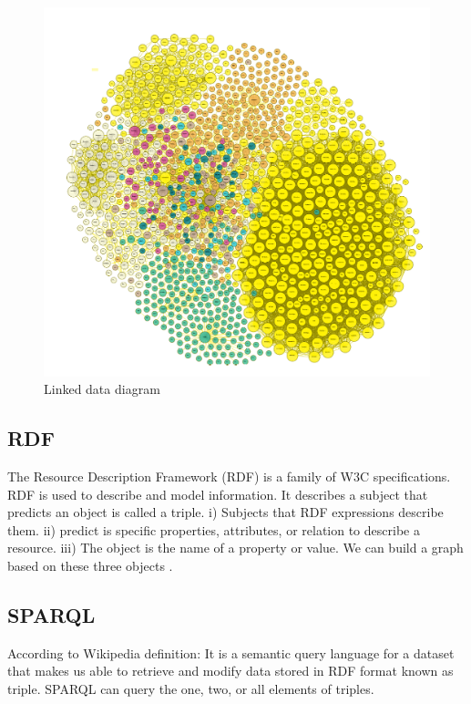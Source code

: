 \begin{center}
	\begin{figure}[htb!]
		
		\begin{minipage}{0.55\linewidth}
			\centering
			\includegraphics[width=1.55\textwidth]{images/chap02_LinkData.png}
		\end{minipage}
		\caption[Linked data diagram]{Linked data diagram \cite{Hector}}
		
		
	\end{figure}
	
\end{center}
\subsection{RDF}
The Resource Description Framework (RDF) is a family of W3C specifications. RDF is used to describe and model information. It describes a subject that predicts an object is called a triple.
i) Subjects that RDF expressions describe them.
ii) predict is specific properties, attributes, or relation to describe a resource.
iii) The object is the name of a property or value.
We can build a graph based on these three objects \cite{Hector}.

\subsection{SPARQL}
According to Wikipedia definition: It is a semantic query language for a dataset that makes us able to retrieve and modify data stored in RDF format known as triple. SPARQL can query the one, two, or all elements of triples.    

